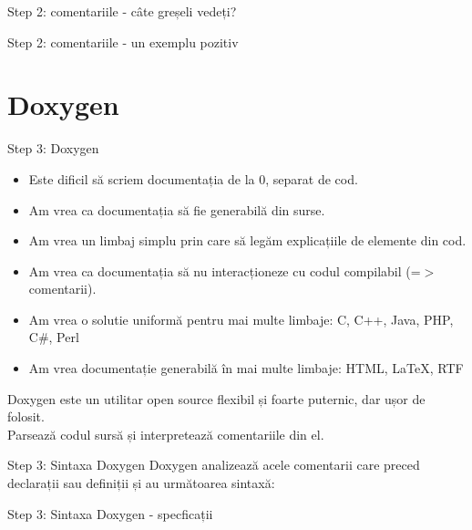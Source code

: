 \documentclass{beamer}
\begin{document}
\begin{frame}{Step 2: comentariile - câte greșeli vedeți?}
	
\end{frame}

\begin{frame}{Step 2: comentariile - un exemplu pozitiv}
	
\end{frame}

\section{Doxygen}

\begin{frame}{Step 3: Doxygen}
	\begin{itemize}	
		\item Este dificil să scriem documentația de la 0, separat de cod.
		\pause
		\item Am vrea ca documentația să fie generabilă din surse.
		\pause
		\item Am vrea un limbaj simplu prin care să legăm explicațiile de elemente din cod.
		\pause
		\item Am vrea ca documentația să nu interacționeze cu codul compilabil (=$>$ comentarii).
		\pause
		\item Am vrea o solutie uniformă pentru mai multe limbaje: C, C++, Java, PHP, C\#, Perl
		\pause
		\item Am vrea documentație generabilă în mai multe limbaje: HTML, LaTeX, RTF
	\end{itemize}
	Doxygen este un utilitar open source flexibil și foarte puternic, dar ușor de folosit. \pause \\
	Parsează codul sursă și interpretează comentariile din el.
\end{frame}

\begin{frame}{Step 3: Sintaxa Doxygen}
	Doxygen analizează acele comentarii care preced declarații sau definiții și au următoarea sintaxă: \\
	
\end{frame}

\begin{frame}{Step 3: Sintaxa Doxygen - specficații}
	
\end{frame}
\end{document}
